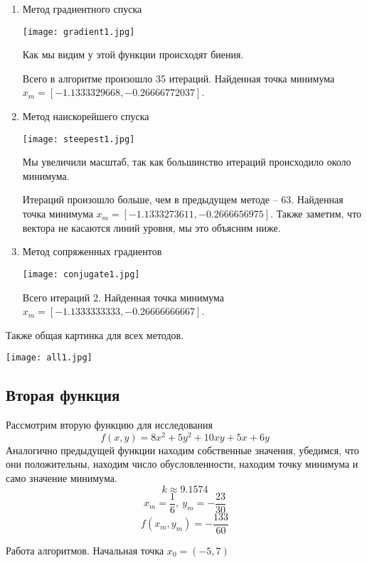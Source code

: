 \begin{enumerate}
    \item Метод градиентного спуска
    
    \texttt{[image: gradient1.jpg]}

    Как мы видим у этой функции происходят биения.

    Всего в алгоритме произошло 35 итераций. Найденная точка минимума
    $x_m = [-1.1333329668, -0.26666772037]$.

    \item Метод наискорейшего спуска
    
    \texttt{[image: steepest1.jpg]}

    Мы увеличили масштаб, так как большинство итераций происходило
    около минимума.

    Итераций произошло больше, чем в предыдущем методе -- 63.
    Найденная точка минимума $x_m = [-1.1333273611, -0.2666656975]$.
    Также заметим, что вектора не касаются линий уровня, мы это объясним ниже.

    \item Метод сопряженных градиентов

    \texttt{[image: conjugate1.jpg]}

    Всего итераций 2.
    Найденная точка минимума \newline $x_m = [-1.1333333333, -0.26666666667]$.

\end{enumerate}

Также общая картинка для всех методов.

\texttt{[image: all1.jpg]}


 \subsection{Вторая функция}
Рассмотрим вторую функцию для исследования $$f(x, y) = 8x^2 + 5y^2 + 10xy + 5x + 6y$$
Аналогично предыдущей функции находим собственные значения, убедимся, что они положительны, находим число
обусловленности, находим точку минимума
и само значение минимума.
$$k \approx 9.1574$$
$$x_m = \frac{1}{6},\ y_m = -\frac{23}{30}$$
$$f(x_m, y_m) = -\frac{133}{60}$$

Работа алгоритмов. Начальная точка $x_0 = (-5, 7)$

